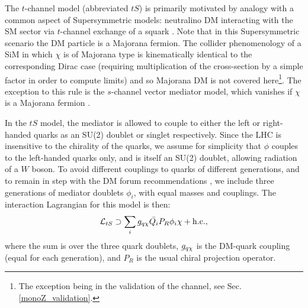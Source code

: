 
The $t$-channel model (abbreviated $tS$) is primarily
motivated by analogy with a common aspect of Supersymmetric models: neutralino DM interacting with the SM sector via $t$-channel exchange of a squark \cite{SUSYDM}. Note that in this Supersymmetric scenario the DM particle is a Majorana fermion. The collider phenomenology of a SiM in which $\chi$ is of Majorana type is kinematically identical to the corresponding Dirac case (requiring multiplication of the cross-section by a simple factor in order to compute limits) and so Majorana DM is not covered here\footnote{The exception being in the validation of the \monoZ channel, see Sec. \ref{monoZ_validation}.}. The exception to this rule is the $s$-channel vector mediator model, which vanishes if $\chi$ is a Majorana fermion \cite{METSig}.

In the $tS$ model, the mediator is allowed to couple to either the left or right-handed quarks as an SU(2) doublet or singlet respectively. Since the LHC is insensitive to the chirality of the quarks, we assume for simplicity that $\phi$ couples to the left-handed quarks only, and is itself an SU(2) doublet, allowing radiation of a $W$ boson. To avoid different couplings to quarks of different generations, and to remain in step with the DM forum recommendations \cite{DMForumReport}, we include three generations of mediator doublets $\phi_i$, with equal masses and couplings. The interaction Lagrangian for this model is then:
\begin{equation}
\label{L_int_tS}
\mathcal{L}_{tS} \supset \sum_{i} g_{q \chi} \bar{Q_i} P_R \phi_i \chi + {\rm h.c.},
\end{equation}
where the sum is over the three quark doublets, $g_{q \chi}$ is the DM-quark coupling (equal for each generation), and $P_R$ is the usual chiral projection operator.

